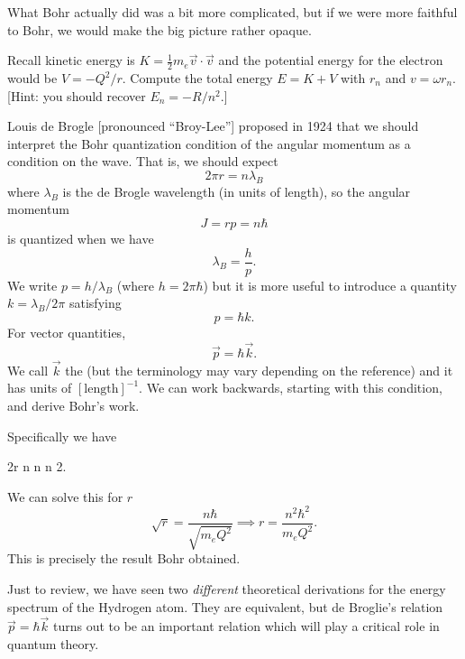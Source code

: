 \begin{remark}
What Bohr actually did was a bit more complicated, but if we were more
faithful to Bohr, we would make the big picture rather opaque.
\end{remark}

\begin{exercise}
Recall kinetic energy is $K=\frac{1}{2}m_{e}\vec{v}\cdot\vec{v}$ and the
potential energy for the electron would be $V = -Q^{2}/r$. Compute the
total energy $E = K + V$ with $r_{n}$ and $v=\omega r_{n}$. [Hint: you
  should recover $E_{n}=-R/n^{2}$.]
\end{exercise}

Louis de Brogle [pronounced ``Broy-Lee''] proposed in 1924 that we
should interpret the Bohr quantization condition of the angular momentum
as a condition on the wave. That is, we should expect
\begin{equation}
2\pi r = n\lambda_{B}
\end{equation}
where $\lambda_{B}$ is the de Brogle wavelength (in units of length), so
the angular momentum 
\begin{equation}
J = rp = n\hbar
\end{equation}
is quantized when we have
\begin{equation}
\lambda_{B} = \frac{h}{p}.
\end{equation}
We write $p = h/\lambda_{B}$ (where $h=2\pi\hbar$) but it is more useful
to introduce a quantity $k=\lambda_{B}/2\pi$ satisfying
\begin{equation}
p = \hbar k.
\end{equation}
For vector quantities,
\begin{equation}
\vec{p} = \hbar\vec{k}.
\end{equation}
We call $\vec{k}$ the  (but the terminology
may vary depending on the reference) and it has units of
$[\mbox{length}]^{-1}$. We can work backwards, starting with this
condition, and derive Bohr's work. 

Specifically we have
\begin{calculation}
2\pi r
n 
n 
n 2\pi\hbar{}.
\end{calculation}
We can solve this for $r$
\begin{equation}
  \sqrt{r} = \frac{n\hbar}{\sqrt{m_{e}Q^{2}}}\implies
r = \frac{n^{2}\hbar^{2}}{m_{e}Q^{2}}.
\end{equation}
This is precisely the result Bohr obtained.

\begin{remark}
Just to review, we have seen two \emph{different} theoretical
derivations for the energy spectrum of the Hydrogen atom. They are
equivalent, but de Broglie's relation $\vec{p}=\hbar\vec{k}$ turns out
to be an important relation which will play a critical role in quantum
theory. 
\end{remark}